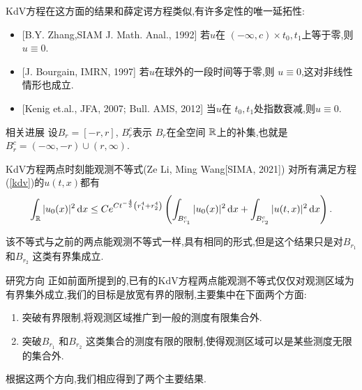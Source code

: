 \begin{frame}[t]
  KdV方程在这方面的结果和薛定谔方程类似,有许多定性的唯一延拓性:
  \begin{itemize}
    \item {}[B.Y. Zhang,SIAM J. Math. Anal., 1992] 若$u$在 $(-\infty,c)\times {t_0,t_1}$上等于零,则$u\equiv 0$.
    \item {}[J. Bourgain, IMRN, 1997] 若$u$在球外的一段时间等于零,则 $u\equiv 0$,这对非线性情形也成立.
    \item {}[Kenig et.al., JFA, 2007; Bull. AMS, 2012] 当$u$在 $t_0,t_1$处指数衰减,则$u\equiv 0$.
  \end{itemize}
\end{frame}
\begin{frame}[t]{相关进展}
  设$B_r=[-r,r]$, $B_r^c$表示 $B_r$在全空间 $\mathbb{R}$上的补集,也就是$B_r^c=(-\infty,-r)\cup (r,\infty)$.
  \begin{alertblock}{KdV方程两点时刻能观测不等式(Ze Li, Ming Wang[SIMA, 2021])} 
    对所有满足方程(\ref{kdv})的$u(t,x)$都有
  \begin{equation}
    \int_{\mathbb{R}}|u_0(x)|^2\,\mathrm{d}x\le Ce^{Ct ^{-\frac{4}{3}}\left(r_1^4+r_2^4\right)}\left( \int_{B_{r_1}^c}|u_0(x)|^2\,\mathrm{d}x+\int_{B_{r_2}^c}|u(t,x)|^2 \,\mathrm{d}x \right).\label{kdv-obs-old}
  \end{equation}
\end{alertblock}
  该不等式与之前的两点能观测不等式一样,具有相同的形式,但是这个结果只是对$B_{r_1}$ 和$B_{r_2}$ 这类有界集成立.
  
\end{frame}

\begin{frame}[t]{研究方向}
  正如前面所提到的,已有的KdV方程两点能观测不等式仅仅对观测区域为有界集外成立,我们的目标是放宽有界的限制,主要集中在下面两个方面:
  \begin{enumerate}
    \item 突破有界限制,将观测区域推广到一般的测度有限集合外.
    \item 突破$B_{r_1}$ 和$B_{r_2}$ 这类集合的测度有限的限制,使得观测区域可以是某些测度无限的集合外.
  \end{enumerate}
根据这两个方向,我们相应得到了两个主要结果.
\end{frame}

